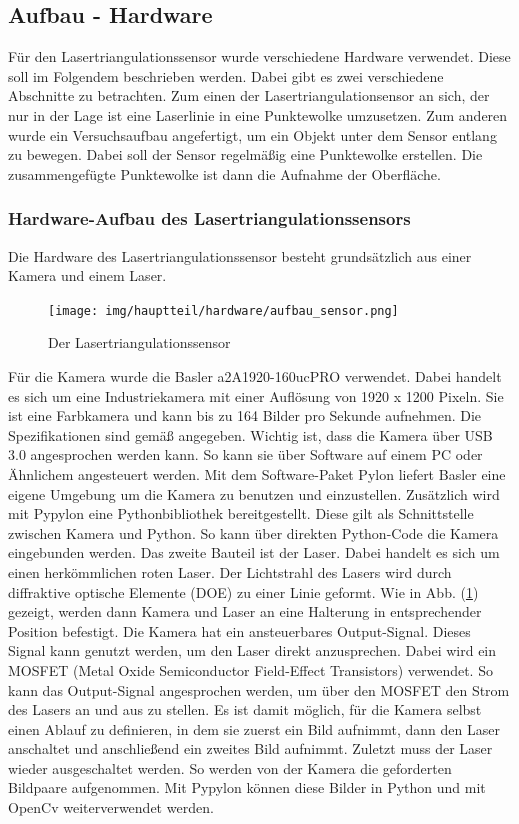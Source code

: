 	\newpage
	
	\subsection{Aufbau - Hardware}
	Für den Lasertriangulationssensor wurde verschiedene Hardware verwendet. Diese soll im Folgendem beschrieben werden. Dabei gibt es zwei verschiedene Abschnitte zu betrachten. Zum einen der Lasertriangulationsensor an sich, der nur in der Lage ist eine Laserlinie in eine Punktewolke umzusetzen. Zum anderen wurde ein Versuchsaufbau angefertigt, um ein Objekt unter dem Sensor entlang zu bewegen. Dabei soll der Sensor regelmäßig eine Punktewolke erstellen. Die zusammengefügte Punktewolke ist dann die Aufnahme der Oberfläche. 
	
		\subsubsection{Hardware-Aufbau des Lasertriangulationssensors}
		Die Hardware des Lasertriangulationssensor besteht grundsätzlich aus einer Kamera und einem Laser.
		
		\begin{figure}[h]
			\centering
			\texttt{[image: img/hauptteil/hardware/aufbau\_sensor.png]}
			\caption{Der Lasertriangulationssensor}
			\label{fig:aufbau_sensor}
		\end{figure}
		Für die Kamera wurde die Basler a2A1920-160ucPRO verwendet. Dabei handelt es sich um eine Industriekamera mit einer Auflösung von 1920 x 1200 Pixeln. Sie ist eine Farbkamera und kann bis zu 164 Bilder pro Sekunde aufnehmen. Die Spezifikationen sind gemäß \citep[vgl.][]{noauthor_a2a1920-160ucpro_nodate} angegeben. Wichtig ist, dass die Kamera über USB 3.0 angesprochen werden kann. So kann sie über Software auf einem PC oder Ähnlichem angesteuert werden. Mit dem Software-Paket Pylon liefert Basler eine eigene Umgebung um die Kamera zu benutzen und einzustellen. Zusätzlich wird mit Pypylon eine Pythonbibliothek bereitgestellt. Diese gilt als Schnittstelle zwischen Kamera und Python. So kann über direkten Python-Code die Kamera eingebunden werden. \newline
		Das zweite Bauteil ist der Laser. Dabei handelt es sich um einen herkömmlichen roten Laser. Der Lichtstrahl des Lasers wird durch diffraktive optische Elemente (DOE) zu einer Linie geformt. Wie in Abb. (\ref{fig:aufbau_sensor}) gezeigt, werden dann Kamera und Laser an eine Halterung in entsprechender Position befestigt. \newline
		Die Kamera hat ein ansteuerbares Output-Signal. Dieses Signal kann genutzt werden, um den Laser direkt anzusprechen. Dabei wird ein MOSFET (Metal Oxide Semiconductor Field-Effect Transistors) verwendet. So kann das Output-Signal angesprochen werden, um über den MOSFET den Strom des Lasers an und aus zu stellen. Es ist damit möglich, für die Kamera selbst einen Ablauf zu definieren, in dem sie zuerst ein Bild aufnimmt, dann den Laser anschaltet und anschließend ein zweites Bild aufnimmt. Zuletzt muss der Laser wieder ausgeschaltet werden. So werden von der Kamera die geforderten Bildpaare aufgenommen. Mit Pypylon können diese Bilder in Python und mit OpenCv weiterverwendet werden.
		
